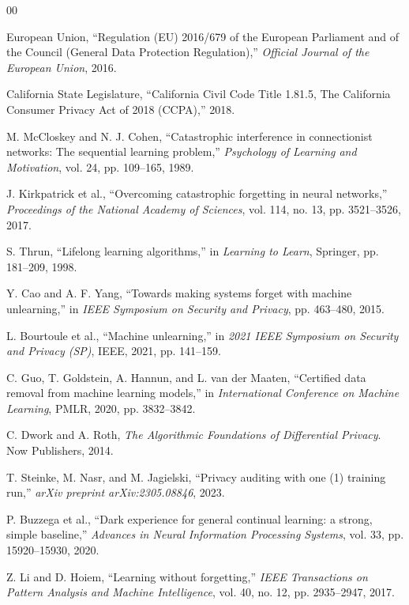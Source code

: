 \documentclass[conference]{IEEEtran}
\theoremstyle{plain}
\theoremstyle{definition}
\theoremstyle{remark}
\begin{document}
\begin{thebibliography}{00}

European Union, ``Regulation (EU) 2016/679 of the European Parliament and of the Council (General Data Protection Regulation),'' \textit{Official Journal of the European Union}, 2016.

California State Legislature, ``California Civil Code Title 1.81.5, The California Consumer Privacy Act of 2018 (CCPA),'' 2018.

M. McCloskey and N. J. Cohen, ``Catastrophic interference in connectionist networks: The sequential learning problem,'' \textit{Psychology of Learning and Motivation}, vol. 24, pp. 109--165, 1989.

J. Kirkpatrick et al., ``Overcoming catastrophic forgetting in neural networks,'' \textit{Proceedings of the National Academy of Sciences}, vol. 114, no. 13, pp. 3521--3526, 2017.

S. Thrun, ``Lifelong learning algorithms,'' in \textit{Learning to Learn}, Springer, pp. 181--209, 1998.

Y. Cao and A. F. Yang, ``Towards making systems forget with machine unlearning,'' in \textit{IEEE Symposium on Security and Privacy}, pp. 463--480, 2015.

L. Bourtoule et al., ``Machine unlearning,'' in \textit{2021 IEEE Symposium on Security and Privacy (SP)}, IEEE, 2021, pp. 141--159.

C. Guo, T. Goldstein, A. Hannun, and L. van der Maaten, ``Certified data removal from machine learning models,'' in \textit{International Conference on Machine Learning}, PMLR, 2020, pp. 3832--3842.

C. Dwork and A. Roth, \textit{The Algorithmic Foundations of Differential Privacy}. Now Publishers, 2014.

T. Steinke, M. Nasr, and M. Jagielski, ``Privacy auditing with one (1) training run,'' \textit{arXiv preprint arXiv:2305.08846}, 2023.

P. Buzzega et al., ``Dark experience for general continual learning: a strong, simple baseline,'' \textit{Advances in Neural Information Processing Systems}, vol. 33, pp. 15920--15930, 2020.

Z. Li and D. Hoiem, ``Learning without forgetting,'' \textit{IEEE Transactions on Pattern Analysis and Machine Intelligence}, vol. 40, no. 12, pp. 2935--2947, 2017.


\end{thebibliography}
\end{document}
